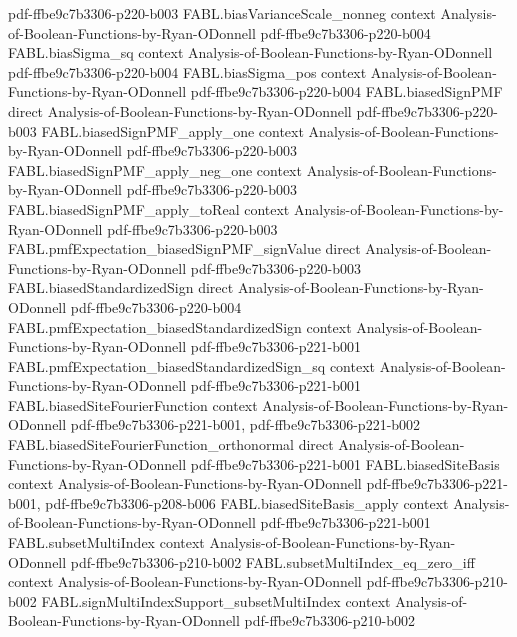 \begin{theorem}
  {pdf-ffbe9c7b3306-p220-b003}
\proofstep
  {FABL.biasVarianceScale_nonneg}
  {context}
  {Analysis-of-Boolean-Functions-by-Ryan-ODonnell}
  {pdf-ffbe9c7b3306-p220-b004}
\proofstep
  {FABL.biasSigma_sq}
  {context}
  {Analysis-of-Boolean-Functions-by-Ryan-ODonnell}
  {pdf-ffbe9c7b3306-p220-b004}
\proofstep
  {FABL.biasSigma_pos}
  {context}
  {Analysis-of-Boolean-Functions-by-Ryan-ODonnell}
  {pdf-ffbe9c7b3306-p220-b004}
\proofstep
  {FABL.biasedSignPMF}
  {direct}
  {Analysis-of-Boolean-Functions-by-Ryan-ODonnell}
  {pdf-ffbe9c7b3306-p220-b003}
\proofstep
  {FABL.biasedSignPMF_apply_one}
  {context}
  {Analysis-of-Boolean-Functions-by-Ryan-ODonnell}
  {pdf-ffbe9c7b3306-p220-b003}
\proofstep
  {FABL.biasedSignPMF_apply_neg_one}
  {context}
  {Analysis-of-Boolean-Functions-by-Ryan-ODonnell}
  {pdf-ffbe9c7b3306-p220-b003}
\proofstep
  {FABL.biasedSignPMF_apply_toReal}
  {context}
  {Analysis-of-Boolean-Functions-by-Ryan-ODonnell}
  {pdf-ffbe9c7b3306-p220-b003}
\proofstep
  {FABL.pmfExpectation_biasedSignPMF_signValue}
  {direct}
  {Analysis-of-Boolean-Functions-by-Ryan-ODonnell}
  {pdf-ffbe9c7b3306-p220-b003}
\proofstep
  {FABL.biasedStandardizedSign}
  {direct}
  {Analysis-of-Boolean-Functions-by-Ryan-ODonnell}
  {pdf-ffbe9c7b3306-p220-b004}
\proofstep
  {FABL.pmfExpectation_biasedStandardizedSign}
  {context}
  {Analysis-of-Boolean-Functions-by-Ryan-ODonnell}
  {pdf-ffbe9c7b3306-p221-b001}
\proofstep
  {FABL.pmfExpectation_biasedStandardizedSign_sq}
  {context}
  {Analysis-of-Boolean-Functions-by-Ryan-ODonnell}
  {pdf-ffbe9c7b3306-p221-b001}
\proofstep
  {FABL.biasedSiteFourierFunction}
  {context}
  {Analysis-of-Boolean-Functions-by-Ryan-ODonnell}
  {pdf-ffbe9c7b3306-p221-b001,
    pdf-ffbe9c7b3306-p221-b002}
\proofstep
  {FABL.biasedSiteFourierFunction_orthonormal}
  {direct}
  {Analysis-of-Boolean-Functions-by-Ryan-ODonnell}
  {pdf-ffbe9c7b3306-p221-b001}
\proofstep
  {FABL.biasedSiteBasis}
  {context}
  {Analysis-of-Boolean-Functions-by-Ryan-ODonnell}
  {pdf-ffbe9c7b3306-p221-b001,
    pdf-ffbe9c7b3306-p208-b006}
\proofstep
  {FABL.biasedSiteBasis_apply}
  {context}
  {Analysis-of-Boolean-Functions-by-Ryan-ODonnell}
  {pdf-ffbe9c7b3306-p221-b001}
\proofstep
  {FABL.subsetMultiIndex}
  {context}
  {Analysis-of-Boolean-Functions-by-Ryan-ODonnell}
  {pdf-ffbe9c7b3306-p210-b002}
\proofstep
  {FABL.subsetMultiIndex_eq_zero_iff}
  {context}
  {Analysis-of-Boolean-Functions-by-Ryan-ODonnell}
  {pdf-ffbe9c7b3306-p210-b002}
\proofstep
  {FABL.signMultiIndexSupport_subsetMultiIndex}
  {context}
  {Analysis-of-Boolean-Functions-by-Ryan-ODonnell}
  {pdf-ffbe9c7b3306-p210-b002}

\end{theorem}

